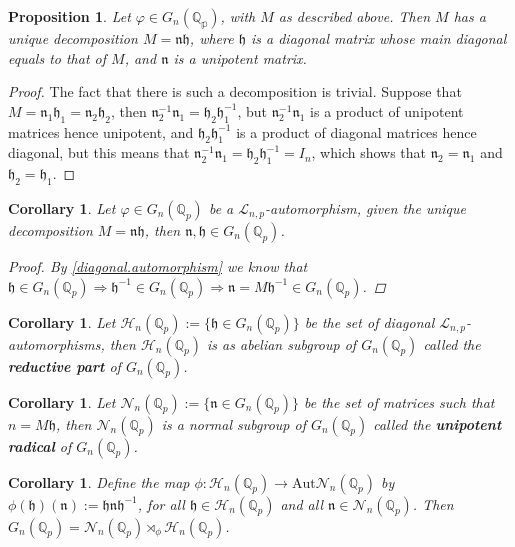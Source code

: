 \documentclass[12pt]{article}
\newtheorem{proposition}[theorem]{Proposition}
\newtheorem{corollary}[theorem]{Corollary}
\begin{document}
\begin{proposition}
Let $\varphi\in{G_{n}(\mathbb{\mathbb{Q}_p})}$, with $M$ as described above. Then $M$ has a unique decomposition $M=\mathfrak{n}\mathfrak{h}$, where $\mathfrak{h}$ is a diagonal matrix whose main diagonal equals to that of $M$, and $\mathfrak{n}$ is a unipotent matrix.
\end{proposition}
\begin{proof}
The fact that there is such a decomposition is trivial. Suppose that $M=\mathfrak{n}_{1}\mathfrak{h}_{1}=\mathfrak{n}_{2}\mathfrak{h}_{2}$, then $\mathfrak{n}_{2}^{-1}\mathfrak{n}_{1}=\mathfrak{h}_{2}\mathfrak{h}_{1}^{-1}$, but $\mathfrak{n}_{2}^{-1}\mathfrak{n}_{1}$ is a product of unipotent matrices hence unipotent, and $\mathfrak{h}_{2}\mathfrak{h}_{1}^{-1}$ is a product of diagonal matrices hence diagonal, but this means that $\mathfrak{n}_{2}^{-1}\mathfrak{n}_{1}=\mathfrak{h}_{2}\mathfrak{h}_{1}^{-1}=I_{n}$, which shows that $\mathfrak{n}_{2}=\mathfrak{n}_{1}$ and $\mathfrak{h}_{2}=\mathfrak{h}_{1}$.
\end{proof}
\begin{corollary}
Let $\varphi\in{G_n(\mathbb{Q}_p)}$ be a $\mathcal{L}_{n,p}$-automorphism, given the unique decomposition $M=\mathfrak{n}\mathfrak{h}$, then $\mathfrak{n},\mathfrak{h}\in{G_{n}}(\mathbb{Q}_p)$.
\begin{proof}
By \ref{diagonal.automorphism} we know that $\mathfrak{h}\in{G_{n}(\mathbb{Q}_p)}\Rightarrow\mathfrak{h}^{-1}\in{G_{n}(\mathbb{Q}_p)}\Rightarrow\mathfrak{n}=M\mathfrak{h}^{-1}\in{G_{n}(\mathbb{Q}_p)}$.
\end{proof}
\end{corollary}
\begin{corollary}
Let $\mathcal{H}_{n}(\mathbb{Q}_p):=\{\mathfrak{h}\in{G_{n}(\mathbb{Q}_p)}\}$ be the set of diagonal $\mathcal{L}_{n,p}$-automorphisms, then $\mathcal{H}_{n}(\mathbb{Q}_p)$ is as abelian subgroup of $G_{n}(\mathbb{Q}_p)$ called the \textbf{reductive part} of $G_{n}(\mathbb{Q}_p)$.
\end{corollary}
\begin{corollary}
Let $\mathcal{N}_{n}(\mathbb{Q}_p):=\{\mathfrak{n}\in{G_{n}(\mathbb{Q}_p)}\}$ be the set of matrices such that $n=M\mathfrak{h}$, then $\mathcal{N}_{n}(\mathbb{Q}_p)$ is a normal subgroup of $G_{n}(\mathbb{Q}_p)$ called the \textbf{unipotent radical} of $G_{n}(\mathbb{Q}_p)$.
\end{corollary}
\begin{corollary}
Define the map $\phi:\mathcal{H}_{n}(\mathbb{Q}_p)\rightarrow\mathrm{Aut}{\mathcal{N}_{n}}(\mathbb{Q}_p)$ by $\phi(\mathfrak{h})(\mathfrak{n}):=\mathfrak{h}\mathfrak{n}\mathfrak{h}^{-1}$, for all $\mathfrak{h}\in\mathcal{H}_{n}(\mathbb{Q}_p)$ and all $\mathfrak{n}\in\mathcal{N}_{n}(\mathbb{Q}_p)$. Then $G_{n}(\mathbb{Q}_p)=\mathcal{N}_{n}(\mathbb{Q}_p)\rtimes_{\phi}\mathcal{H}_{n}(\mathbb{Q}_p)$.
\end{corollary}
\end{document}

